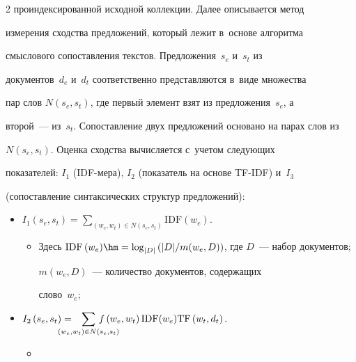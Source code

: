 \begin{multicols}{2}
проиндексированной исходной коллекции. Далее описывается метод 


измерения сходства предложений, который лежит в~основе алгоритма 


смыслового сопоставления текстов. Предложения~$s_e$ и~$s_t$ из 


документов~$d_e$ и~$d_t$ соответственно представляются в~виде множества 


пар слов $N(s_e,s_t)$, где первый элемент взят из предложения~$s_e$, а 


второй~--- из~$s_t$. Сопоставление двух предложений основано на парах слов из 


$N(s_e,s_t)$. Оценка сходства вычисляется с~учетом сле\-ду\-ющих 


показателей: $I_1$ (IDF-ме\-ра), $I_2$ (показатель на основе TF-IDF) и~$I_3$ 


(сопоставление синтаксических структур предложений): 


  \begin{itemize}


  \item[$\bullet$]


  $I_1\left(s_e,s_t\right)= \displaystyle \sum\limits_{(w_e,w_t)\in N(s_e,s_t)} 


\mathrm{IDF}\left( w_e\right).$


  \begin{itemize}


  \item[$\circ$]


Здесь $\mathrm{IDF}\,(w_e)\hm= \log_{\vert D\vert} \left( \vert 


D\vert/m(w_e,D)\right)$, где $D$~---  набор документов; 


$m(w_e,D)$~--- количество документов, содержащих 


слово~$w_e$; 


\end{itemize}


\item[$\bullet$]


$I_2\left( s_e,s_t\right)=\displaystyle\hspace*{-6mm} \sum\limits_{(w_e,w_t)\in N(s_e,s_t)}\hspace*{-8mm} 


f\left( w_e,w_t\right)\mathrm{IDF}(w_e)\mathrm{TF}\left(w_t,d_t\right).$


  \begin{itemize}


  \item[$\circ$]



\end{itemize}
\end{itemize}
\end{multicols}
